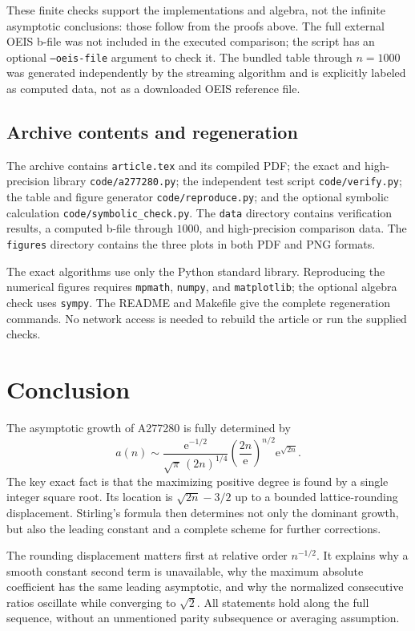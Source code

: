 \documentclass[11pt,letterpaper]{article}
\theoremstyle{remark}
\newcommand{\ee}{\mathrm{e}}
\begin{document}
These finite checks support the implementations and algebra, not the
infinite asymptotic conclusions: those follow from the proofs above.
The full external OEIS b-file was not included in the executed comparison;
the script has an optional \texttt{--oeis-file} argument to check it. The
bundled table through $n=1000$ was generated independently by the streaming
algorithm and is explicitly labeled as computed data, not as a downloaded
OEIS reference file.

\subsection{Archive contents and regeneration}

The archive contains \texttt{article.tex} and its compiled PDF; the exact
and high-precision library \texttt{code/a277280.py}; the independent test
script \texttt{code/verify.py}; the table and figure generator
\texttt{code/reproduce.py}; and the optional symbolic calculation
\texttt{code/symbolic\_check.py}. The \texttt{data} directory contains
verification results, a computed b-file through $1000$, and high-precision
comparison data. The \texttt{figures} directory contains the three plots in
both PDF and PNG formats.

The exact algorithms use only the Python standard library. Reproducing
the numerical figures requires \texttt{mpmath}, \texttt{numpy}, and
\texttt{matplotlib}; the optional algebra check uses \texttt{sympy}.
The README and Makefile give the complete regeneration commands. No network
access is needed to rebuild the article or run the supplied checks.

\section{Conclusion}

The asymptotic growth of A277280 is fully determined by
\[
 a(n)\sim\frac{\ee^{-1/2}}{\sqrt\pi\,(2n)^{1/4}}
         \left(\frac{2n}{\ee}\right)^{n/2}\ee^{\sqrt{2n}}.
\]
The key exact fact is that the maximizing positive degree is found by a
single integer square root. Its location is $\sqrt{2n}-3/2$ up to a bounded
lattice-rounding displacement. Stirling's formula then determines not only
the dominant growth, but also the leading constant and a complete scheme
for further corrections.

The rounding displacement matters first at relative order $n^{-1/2}$.
It explains why a smooth constant second term is unavailable, why the
maximum absolute coefficient has the same leading asymptotic, and why the
normalized consecutive ratios oscillate while converging to $\sqrt2$.
All statements hold along the full sequence, without an unmentioned parity
subsequence or averaging assumption.
\end{document}
